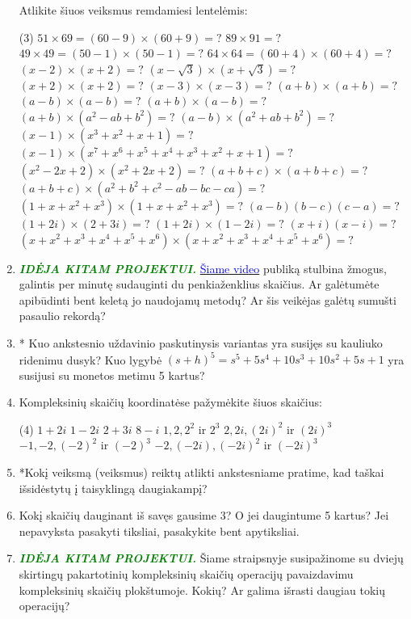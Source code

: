 \documentclass[a4paper]{article}
\newcommand{\goto}[2]{\href{\detokenize{#1}}{\textcolor{blue}{#2}}}
\newcommand{\say}[1]{\textbf{\textit{#1}}}
\begin{document}
\begin{enumerate}
Atlikite šiuos veiksmus remdamiesi lentelėmis:

\begin{tasks}(3)
\task $51 \times 69 = (60 - 9) \times (60 + 9) = ?$
\task $89 \times 91 = ?$
\task $49 \times 49 = (50 -1) \times (50 - 1) = ?$
\task $64 \times 64 = (60 + 4) \times (60 + 4) = ?$
\task $(x-2)\times (x+2) = ?$
\task $(x-\sqrt{3})\times (x+\sqrt{3}) = ?$
\task $(x+2) \times (x+2) = ?$
\task $(x-3) \times (x-3) = ?$
\task $(a+b) \times (a+b) = ?$
\task $(a-b) \times (a-b) = ?$
\task $(a+b) \times (a-b) = ?$
\task $(a+b) \times (a^2-ab+b^2) = ?$
\task $(a-b) \times (a^2+ab+b^2) = ?$
\task $(x-1)\times (x^3+x^2+x+1) = ?$
\task $(x-1)\times (x^7+x^6+x^5+x^4+x^3+x^2+x+1) = ?$
\task $(x^2-2x+2)\times (x^2+2x+2)=?$
\task *$(a+b+c)\times (a+b+c)=?$
\task *$(a+b+c)\times (a^2+b^2+c^2-ab-bc-ca)=?$
\task *$(1+x+x^2+x^3)\times (1+x+x^2+x^3)=?$
\task *$(a-b)(b-c)(c-a)=?$
\task $(1+2i)\times (2+3i)=?$
\task $(1+2i)\times (1-2i)=?$
\task $(x+i)(x-i)=?$
\task $(x+x^2+x^3+x^4+x^5+x^6)\times (x+x^2+x^3+x^4+x^5+x^6)=?$
\end{tasks}
\item \textcolor{green}{\say{IDĖJA KITAM PROJEKTUI.}} \goto{https://www.youtube.com/watch?v=M4vqr3_ROIk}{Šiame video} publiką stulbina žmogus, galintis per minutę sudauginti du penkiaženklius skaičius. Ar galėtumėte apibūdinti bent keletą jo naudojamų metodų? Ar šis veikėjas galėtų sumušti pasaulio rekordą?
\item * Kuo ankstesnio uždavinio paskutinysis variantas yra susijęs su kauliuko ridenimu dusyk? Kuo lygybė $(s+h)^5=s^5+5s^4+10s^3+10s^2+5s+1$ yra susijusi su monetos metimu 5 kartus?
\item Kompleksinių skaičių koordinatėse pažymėkite šiuos skaičius:
\begin{tasks}(4)
\task $1+2i$ \task $1-2i$ \task $2+3i$ \task $8 - i$ \task $1,2,2^2\text{ ir }2^3$ \task $2,2i,(2i)^2 \text{ ir } (2i)^3$ \task $-1, -2, (-2)^2 \text{ ir } (-2)^3$ \task $-2,(-2i),(-2i)^2 \text{ ir } (-2i)^3$
\end{tasks}
\item *Kokį veiksmą (veiksmus) reiktų atlikti ankstesniame pratime, kad taškai išsidėstytų į taisyklingą daugiakampį?
\item Kokį skaičių dauginant iš savęs gausime 3? O jei daugintume 5 kartus? Jei nepavyksta pasakyti tiksliai, pasakykite bent apytiksliai.
\item \textcolor{green}{\say{IDĖJA KITAM PROJEKTUI.}} Šiame straipsnyje susipažinome su dviejų skirtingų pakartotinių kompleksinių skaičių operacijų pavaizdavimu kompleksinių skaičių plokštumoje. Kokių? Ar galima išrasti daugiau tokių operacijų?
\end{enumerate}
\end{document}
